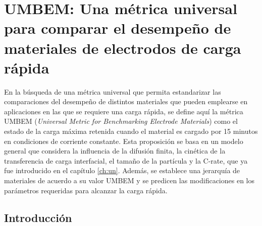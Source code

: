 \chapter{UMBEM: Una métrica universal para comparar el desempeño de materiales de electrodos de carga rápida}\label{ch:umbem}
\thispagestyle{empty}

\vspace{50pt}

\begin{adjustwidth}{50pt}{50pt}
    En la búsqueda de una métrica universal que permita estandarizar las 
    comparaciones del desempeño de distintos materiales que pueden emplearse en 
    aplicaciones en las que se requiere una carga rápida, se define aquí la 
    métrica UMBEM (\textit{Universal Metric for Benchmarking Electrode Materials}) como el 
    estado de la carga máxima retenida cuando el material es cargado por 15 
    minutos en condiciones de corriente constante. Esta proposición se basa 
    en un modelo general que considera la influencia de la difusión finita, 
    la cinética de la transferencia de carga interfacial, el tamaño de la partícula y la 
    C-rate, que ya fue introducido en el capítulo \ref{ch:un}. Además, se establece
    una jerarquía de materiales de acuerdo a su valor UMBEM y se predicen las 
    modificaciones en los parámetros requeridas para alcanzar la carga rápida.
\end{adjustwidth}

\clearpage
\newpage
\thispagestyle{empty}
\mbox{}
\newpage

\section{Introducción}

